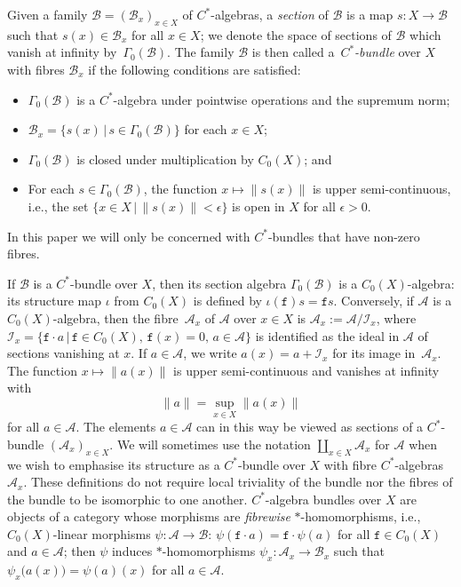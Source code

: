 \documentclass[10pt,a4paper]{amsart}
\numberwithin{equation}{section}
\newcommand{\CI}{\mathcal{I}}
\def\alg{{\mathcal A}}
\def\balg{{\mathcal B}}
\begin{document}
Given a family $\balg=(\balg_x)_{x\in X}$ of $C^*$-algebras, a
\emph{section} of $\balg$ is
a map $s\colon X\to\balg$ such that $s(x)\in\balg_x$ for all $x\in X$; we
denote the space of sections of $\balg$ which vanish at infinity by~$\Gamma_0(\balg)$. The family $\balg$ is then called a~\emph{$C^*$-bundle} over $X$ with fibres $\balg_x$ if the following
conditions are satisfied:
\begin{itemize}\itemsep=0pt
\item
$\Gamma_0(\balg)$ is a $C^*$-algebra under pointwise operations and the
 supremum norm;
\item $\balg_x=\{s(x)\, |\, s\in\Gamma_0(\balg)\}$ for each
 $x\in X$;
\item $\Gamma_0(\balg)$ is closed under multiplication by
 $C_0(X)$; and
\item For each $s\in\Gamma_0(\balg)$, the function $x\mapsto \|s(x)\|$
is upper semi-continuous, i.e., the set
$\{x\in X \,|\, \|s(x)\|< \epsilon\}$ is open in $X$ for all $\epsilon>0$.
\end{itemize}
In this
paper we will only be concerned with $C^*$-bundles that have non-zero fibres.

If $\balg$ is a $C^*$-bundle over $X$, then its section algebra
$\Gamma_0(\balg)$ is a $C_0(X)$-algebra: its structure map $\iota$ from
$C_0(X)$ is defined by $\iota(\mathtt{f})s=\mathtt{f} s$. Conversely, if $\alg$ is a
$C_0(X)$-algebra, then the fibre~$\alg_x$ of $\alg$ over $x\in X$ is $\alg_x:=\alg/\CI_x$, where
$\CI_x=\{\mathtt{f}\cdot a\, |\, \mathtt{f}\in C_0(X) , \,
\mathtt{f}(x)=0 , \, a\in\alg\}$ is identified as the ideal in
$\alg$ of sections vanishing at $x$. If
$a\in\alg$, we write $a(x)=a+\CI_x$ for its image in~$\alg_x$. The
function $x\mapsto\|a(x)\|$ is upper semi-continuous
and vanishes at infinity with
\[
\|a\| = \sup_{x\in X} \big\|a(x)\big\|
\]
for all $a\in\alg$. The
elements $a\in \alg$ can in this way be viewed as sections of a
$C^*$-bundle $(\alg_x)_{x\in X}$. We will sometimes use the
notation $\coprod_{x\in X} \alg_x$ for $\alg$ when we wish to emphasise
its structure as a $C^*$-bundle over $X$ with fibre $C^*$-algebras
$\alg_x$. These definitions do not require
local triviality of the bundle nor the fibres of the bundle to be
isomorphic to one another. $C^*$-algebra bundles over $X$ are objects of a
category whose morphisms are \emph{fibrewise} $*$-homomorphisms,
i.e., $C_0(X)$-linear morphisms $\psi\colon \alg\to\balg$: $\psi(\mathtt{f}\cdot
a)=\mathtt{f}\cdot\psi(a)$ for all $\mathtt{f}\in C_0(X)$ and $a\in\alg$; then $\psi$
induces $*$-homomorphisms $\psi_x\colon \alg_x\to\balg_x$ such that
$\psi_x\big(a(x)\big)=\psi(a)(x)$ for all $a\in\alg$.
\end{document}
